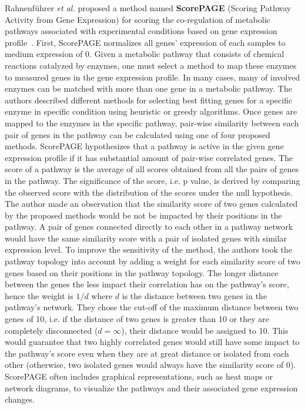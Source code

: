 \documentclass[Minh_PhD_thesis.tex]{subfiles}
\begin{document}
Rahnenf{\"u}hrer \textit{et al.} proposed a method named \textbf{ScorePAGE} (Scoring Pathway Activity from Gene Expression) for scoring the co-regulation of metabolic pathways associated with experimental conditions based on gene expression profile~\cite{Rahnenfuhrer:2004}. 
First, ScorePAGE normalizes all genes' expression of each samples to medium expression of 0.
Given a metabolic pathway that consists of chemical reactions catalyzed by enzymes, one must select a method to map these enzymes to measured genes in the gene expression profile.
In many cases, many of involved enzymes can be matched with more than one gene in a metabolic pathway.
The authors described different methods for selecting best fitting genes for a specific enzyme in specific condition using heuristic or greedy algorithms.
Once genes are mapped to the enzymes in the specific pathway, pair-wise similarity between each pair of genes in the pathway can be calculated using one of four proposed methods.
ScorePAGE hypothesizes that a pathway is active in the given gene expression profile if it has substantial amount of pair-wise correlated genes.
The score of a pathway is the average of all scores obtained from all the pairs of genes in the pathway.
The significance of the score, i.e. p value, is derived by comparing the observed score with the distribution of the scores under the null hypothesis.
The author made an observation that the similarity score of two genes calculated by the proposed methods would be not be impacted by their positions in the pathway.
A pair of genes connected directly to each other in a pathway network would have the same similarity score with a pair of isolated genes with similar expression level.
To improve the sensitivity of the method, the authors took the pathway topology into account by adding a weight for each similarity score of two genes based on their positions in the pathway topology. The longer distance between the genes the less impact their correlation has on the pathway's score, hence the weight is $1/d$ where $d$ is the distance between two genes in the pathway's network.
They chose the cut-off of the maximum distance between two genes of 10, i.e. if the distance of two genes is greater than 10 or they are completely disconnected ($d = \infty$), their distance would be assigned to 10.
This would guarantee that two highly correlated genes would still have some impact to the pathway's score even when they are at great distance or isolated from each other (otherwise, two isolated genes would always have the similarity score of 0). 
ScorePAGE often includes graphical representations, such as heat maps or network diagrams, to visualize the pathways and their associated gene expression changes.
\end{document}
